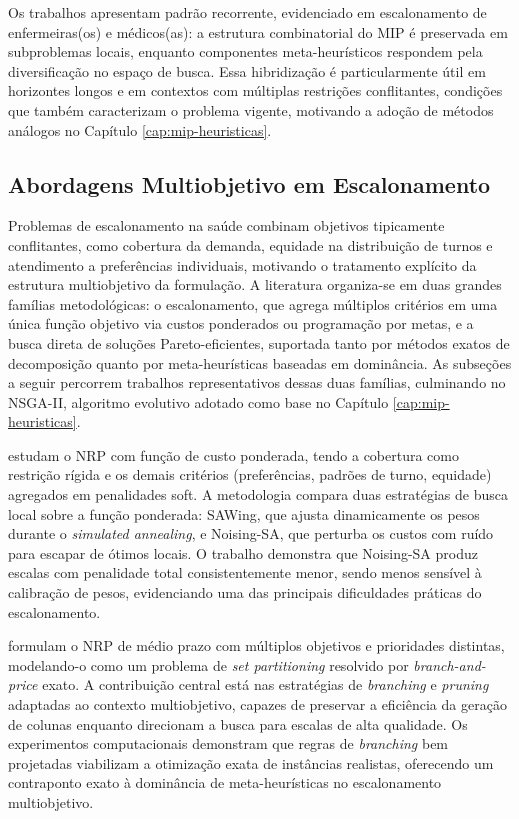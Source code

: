 Os trabalhos apresentam padrão recorrente, evidenciado em escalonamento de enfermeiras(os) e médicos(as): a estrutura combinatorial do MIP é preservada em subproblemas locais, enquanto componentes meta-heurísticos respondem pela diversificação no espaço de busca. Essa hibridização é particularmente útil em horizontes longos e em contextos com múltiplas restrições conflitantes, condições que também caracterizam o problema vigente, motivando a adoção de métodos análogos no Capítulo \ref{cap:mip-heuristicas}.

\subsection{Abordagens Multiobjetivo em Escalonamento}
\label{2rev-sec3-sub1}

Problemas de escalonamento na saúde combinam objetivos tipicamente conflitantes, como cobertura da demanda, equidade na distribuição de turnos e atendimento a preferências individuais, motivando o tratamento explícito da estrutura multiobjetivo da formulação. A literatura organiza-se em duas grandes famílias metodológicas: o escalonamento, que agrega múltiplos critérios em uma única função objetivo via custos ponderados ou programação por metas, e a busca direta de soluções Pareto-eficientes, suportada tanto por métodos exatos de decomposição quanto por meta-heurísticas baseadas em dominância. As subseções a seguir percorrem trabalhos representativos dessas duas famílias, culminando no NSGA-II, algoritmo evolutivo adotado como base no Capítulo \ref{cap:mip-heuristicas}.

 estudam o NRP com função de custo ponderada, tendo a cobertura como restrição rígida e os demais critérios (preferências, padrões de turno, equidade) agregados em penalidades soft. A metodologia compara duas estratégias de busca local sobre a função ponderada: SAWing, que ajusta dinamicamente os pesos durante o \textit{simulated annealing}, e Noising-SA, que perturba os custos com ruído para escapar de ótimos locais. O trabalho demonstra que Noising-SA produz escalas com penalidade total consistentemente menor, sendo menos sensível à calibração de pesos, evidenciando uma das principais dificuldades práticas do escalonamento.

 formulam o NRP de médio prazo com múltiplos objetivos e prioridades distintas, modelando-o como um problema de \textit{set partitioning} resolvido por \textit{branch-and-price} exato. A contribuição central está nas estratégias de \textit{branching} e \textit{pruning} adaptadas ao contexto multiobjetivo, capazes de preservar a eficiência da geração de colunas enquanto direcionam a busca para escalas de alta qualidade. Os experimentos computacionais demonstram que regras de \textit{branching} bem projetadas viabilizam a otimização exata de instâncias realistas, oferecendo um contraponto exato à dominância de meta-heurísticas no escalonamento multiobjetivo.

